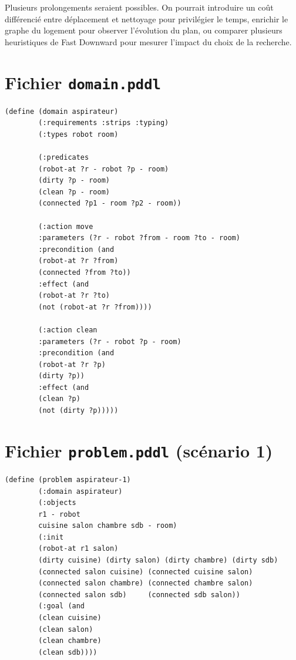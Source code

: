 \documentclass[a4paper, 11pt]{report}
\begin{document}
	Plusieurs prolongements seraient possibles. On pourrait introduire un coût différencié entre déplacement et nettoyage pour privilégier le temps, enrichir le graphe du logement pour observer l'évolution du plan, ou comparer plusieurs heuristiques de Fast Downward pour mesurer l'impact du choix de la recherche.
	
	\appendix
	\renewcommand{\thesection}{\Alph{section}}
	
	
	\newpage
	\section{Fichier \texttt{domain.pddl}}
	
	\begin{lstlisting}[style=pddl, caption={Domaine complet.}]
		(define (domain aspirateur)
		(:requirements :strips :typing)
		(:types robot room)
		
		(:predicates
		(robot-at ?r - robot ?p - room)
		(dirty ?p - room)
		(clean ?p - room)
		(connected ?p1 - room ?p2 - room))
		
		(:action move
		:parameters (?r - robot ?from - room ?to - room)
		:precondition (and
		(robot-at ?r ?from)
		(connected ?from ?to))
		:effect (and
		(robot-at ?r ?to)
		(not (robot-at ?r ?from))))
		
		(:action clean
		:parameters (?r - robot ?p - room)
		:precondition (and
		(robot-at ?r ?p)
		(dirty ?p))
		:effect (and
		(clean ?p)
		(not (dirty ?p)))))
	\end{lstlisting}
	
	\section{Fichier \texttt{problem.pddl} (scénario 1)}
	
	\begin{lstlisting}[style=pddl, caption={Problème du scénario 1.}]
		(define (problem aspirateur-1)
		(:domain aspirateur)
		(:objects
		r1 - robot
		cuisine salon chambre sdb - room)
		(:init
		(robot-at r1 salon)
		(dirty cuisine) (dirty salon) (dirty chambre) (dirty sdb)
		(connected salon cuisine) (connected cuisine salon)
		(connected salon chambre) (connected chambre salon)
		(connected salon sdb)     (connected sdb salon))
		(:goal (and
		(clean cuisine)
		(clean salon)
		(clean chambre)
		(clean sdb))))
	\end{lstlisting}
	
\end{document}
